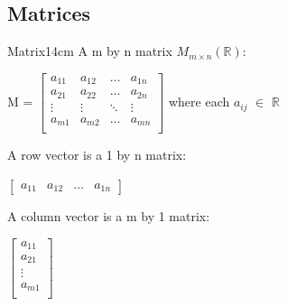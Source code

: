 \subsection{ Matrices }

    \begin{definition}{Matrix}{14cm}
        A {\color{lblue} m by n matrix} $M_{m \times n}(\mathbb{R})$:

        \hspace{0.5cm}
        M =
        $\begin{bmatrix}
            a_{11} & a_{12} & \hdots & a_{1n} \\
            
            a_{21} & a_{22} & \hdots & a_{2n} \\
            
            \vdots & \vdots & \ddots & \vdots \\
            
            a_{m1} & a_{m2} & \hdots & a_{mn} \\
        \end{bmatrix}$
        \hspace{1cm}
        where each $a_{ij}$ $\in$ $\mathbb{R}$

        \vspace{0.3cm}



        A {\color{lblue} row vector} is a 1 by n matrix:

        \hspace{0.5cm}
        $\begin{bmatrix}
            a_{11}
            & a_{12}
            & \hdots
            & a_{1n}
        \end{bmatrix}$

        \vspace{0.3cm}



        A {\color{lblue} column vector} is a m by 1 matrix:

        \hspace{0.5cm}
        $\begin{bmatrix}
            a_{11} \\
            a_{21} \\
            \vdots \\
            a_{m1} \\
        \end{bmatrix}$

        \vspace{0.3cm}




\end{definition}
